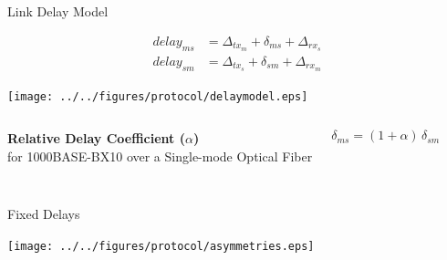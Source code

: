 \documentclass[compress,red]{beamer}
\begin{document}
\subsection{}
\begin{frame}{Link Delay Model}

  \begin{align}
    \nonumber delay_{ms} &= \Delta_{tx_m} + \delta_{ms} + \Delta_{rx_s} \\
    \nonumber delay_{sm} &= \Delta_{tx_s} + \delta_{sm} + \Delta_{rx_m}
  \end{align}

   \vspace{0.2cm}

  \begin{center}
  \texttt{[image: ../../figures/protocol/delaymodel.eps]}
  \end{center}

\begin{columns}[c]
  \column{2.8in}

    \begin{center}
      \textbf{Relative Delay Coefficient ($\alpha$)} \\
      for 1000BASE-BX10 over a Single-mode Optical Fiber
    \end{center}

  \column{1.5in}
    \begin{center}
      \begin{equation}
      \nonumber \delta_{ms} = (1 + \alpha) \, \delta_{sm}
      \end{equation}
    \end{center}
    \vspace{0.5cm}
\end{columns}
  
\end{frame}
\subsection{}
\begin{frame}{Fixed Delays}

  \begin{center}
  \texttt{[image: ../../figures/protocol/asymmetries.eps]}
  \end{center}

\end{frame}
\end{document}
